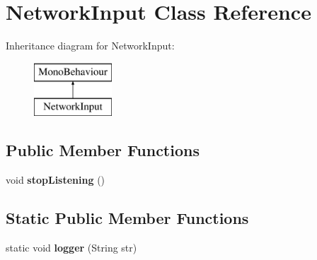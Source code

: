 \hypertarget{class_network_input}{}\section{Network\+Input Class Reference}
\label{class_network_input}
Inheritance diagram for Network\+Input\+:\begin{figure}[H]
\begin{center}
\leavevmode
\includegraphics[height=2.000000cm]{class_network_input}
\end{center}
\end{figure}
\subsection*{Public Member Functions}
\begin{DoxyCompactItemize}
\item 
void {\bfseries stop\+Listening} ()\hypertarget{class_network_input_ae14c953e88a3205806cc0b2831ab0859}{}\label{class_network_input_ae14c953e88a3205806cc0b2831ab0859}

\end{DoxyCompactItemize}
\subsection*{Static Public Member Functions}
\begin{DoxyCompactItemize}
\item 
static void {\bfseries logger} (String str)\hypertarget{class_network_input_a3d501d05461b6e9fd05fc7142eadeb1e}{}\label{class_network_input_a3d501d05461b6e9fd05fc7142eadeb1e}

\end{DoxyCompactItemize}

